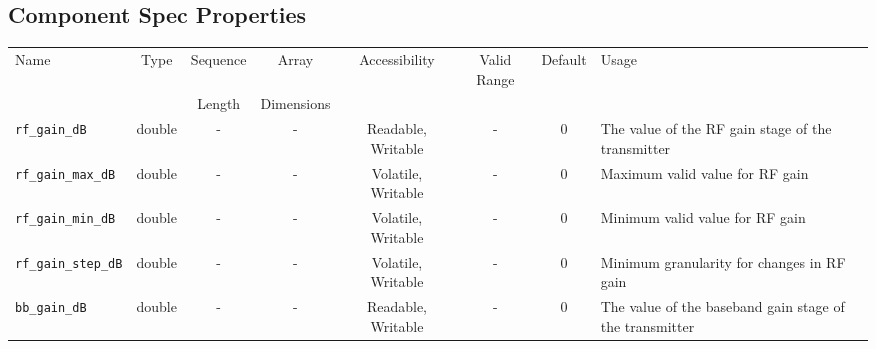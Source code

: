 \documentclass{article}
\begin{document}
\begin{landscape}
	\section*{Component Spec Properties}
	\begin{scriptsize}
		\begin{tabular}{|p{4cm}|c|c|c|c|c|c|p{8cm}|}
			\hline
			\rowcolor{blue}
			Name                                & Type   & Sequence & Array      & Accessibility       & Valid Range & Default & Usage                                                                                                                                       \\
			\rowcolor{blue}
			                                    &        & Length   & Dimensions &                     &             &         &                                                                                                                                             \\
			\hline
			\verb+rf_gain_dB+                   & double & -        & -          & Readable, Writable  & -           & 0       & The value of the RF gain stage of the transmitter                                                                                           \\
			\hline
			\verb+rf_gain_max_dB+               & double & -        & -          & Volatile, Writable & -           & 0       & Maximum valid value for RF gain                                                                                                             \\
			\hline
			\verb+rf_gain_min_dB+               & double & -        & -          & Volatile, Writable & -           & 0       & Minimum valid value for RF gain                                                                                                             \\
			\hline
			\verb+rf_gain_step_dB+              & double & -        & -          & Volatile, Writable & -           & 0       & Minimum granularity for changes in RF gain                                                                                                  \\
			\hline
			\verb+bb_gain_dB+                   & double & -        & -          & Readable, Writable  & -           & 0       & The value of the baseband gain stage of the transmitter                                                                                     \\

\end{tabular}
\end{scriptsize}
\end{landscape}
\end{document}
